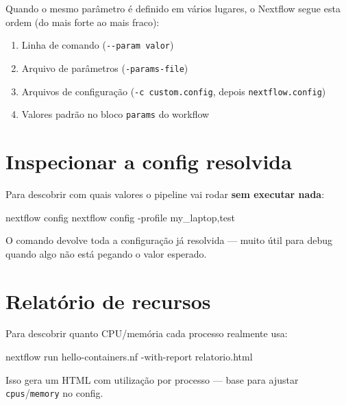 \documentclass[
  brazilian,
  letterpaper,
  DIV=11,
  numbers=noendperiod]{scrreprt}
\newenvironment{Shaded}{\begin{snugshade}}{\end{snugshade}}
\newcommand{\AttributeTok}[1]{\textcolor[rgb]{0.40,0.45,0.13}{#1}}
\newcommand{\ExtensionTok}[1]{\textcolor[rgb]{0.00,0.23,0.31}{#1}}
\newcommand{\NormalTok}[1]{\textcolor[rgb]{0.00,0.23,0.31}{#1}}
\providecommand{\tightlist}{%
  \setlength{\itemsep}{0pt}\setlength{\parskip}{0pt}}
\begin{document}
Quando o mesmo parâmetro é definido em vários lugares, o Nextflow segue
esta ordem (do mais forte ao mais fraco):

\begin{enumerate}
\def\labelenumi{\arabic{enumi}.}
\tightlist
\item
  Linha de comando (\texttt{-\/-param\ valor})
\item
  Arquivo de parâmetros (\texttt{-params-file})
\item
  Arquivos de configuração (\texttt{-c\ custom.config}, depois
  \texttt{nextflow.config})
\item
  Valores padrão no bloco \texttt{params} do workflow
\end{enumerate}

\section{Inspecionar a config
resolvida}\label{inspecionar-a-config-resolvida}

Para descobrir com quais valores o pipeline vai rodar \textbf{sem
executar nada}:

\begin{Shaded}
\begin{Highlighting}[]
\ExtensionTok{nextflow}\NormalTok{ config}
\ExtensionTok{nextflow}\NormalTok{ config }\AttributeTok{{-}profile}\NormalTok{ my\_laptop,test}
\end{Highlighting}
\end{Shaded}

O comando devolve toda a configuração já resolvida --- muito útil para
debug quando algo não está pegando o valor esperado.

\section{Relatório de recursos}\label{relatuxf3rio-de-recursos}

Para descobrir quanto CPU/memória cada processo realmente usa:

\begin{Shaded}
\begin{Highlighting}[]
\ExtensionTok{nextflow}\NormalTok{ run hello{-}containers.nf }\AttributeTok{{-}with{-}report}\NormalTok{ relatorio.html}
\end{Highlighting}
\end{Shaded}

Isso gera um HTML com utilização por processo --- base para ajustar
\texttt{cpus}/\texttt{memory} no config.
\end{document}
